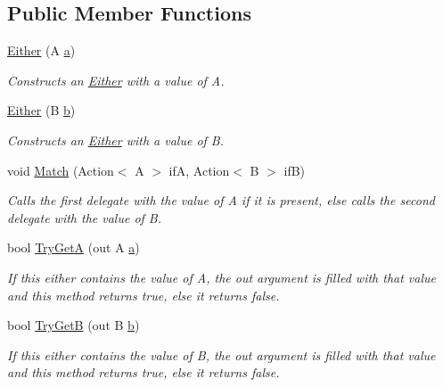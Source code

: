\subsection*{Public Member Functions}
\begin{DoxyCompactItemize}
\item 
\mbox{\hyperlink{struct_leap_1_1_unity_1_1_either_aff7e724eb9b602c97e27bba85b4e3aa1}{Either}} (A \mbox{\hyperlink{struct_leap_1_1_unity_1_1_either_ac7c612037b34bbfb23251111dae09928}{a}})
\begin{DoxyCompactList}\small\item\em Constructs an \mbox{\hyperlink{struct_leap_1_1_unity_1_1_either}{Either}} with a value of A. \end{DoxyCompactList}\item 
\mbox{\hyperlink{struct_leap_1_1_unity_1_1_either_a42d1ab7f4e2bf0794752cc858affec7a}{Either}} (B \mbox{\hyperlink{struct_leap_1_1_unity_1_1_either_aaa579850040ea7c13ab798269e23fd0c}{b}})
\begin{DoxyCompactList}\small\item\em Constructs an \mbox{\hyperlink{struct_leap_1_1_unity_1_1_either}{Either}} with a value of B. \end{DoxyCompactList}\item 
void \mbox{\hyperlink{struct_leap_1_1_unity_1_1_either_a4c0eaf284c03842b99f53ec3f059faac}{Match}} (Action$<$ A $>$ ifA, Action$<$ B $>$ ifB)
\begin{DoxyCompactList}\small\item\em Calls the first delegate with the value of A if it is present, else calls the second delegate with the value of B. \end{DoxyCompactList}\item 
bool \mbox{\hyperlink{struct_leap_1_1_unity_1_1_either_a7ef635be83e9e5e874739d9f363692ef}{Try\+GetA}} (out A \mbox{\hyperlink{struct_leap_1_1_unity_1_1_either_ac7c612037b34bbfb23251111dae09928}{a}})
\begin{DoxyCompactList}\small\item\em If this either contains the value of A, the out argument is filled with that value and this method returns true, else it returns false. \end{DoxyCompactList}\item 
bool \mbox{\hyperlink{struct_leap_1_1_unity_1_1_either_a2936191d85fa4d7dcb85c12ca2f2f471}{Try\+GetB}} (out B \mbox{\hyperlink{struct_leap_1_1_unity_1_1_either_aaa579850040ea7c13ab798269e23fd0c}{b}})
\begin{DoxyCompactList}\small\item\em If this either contains the value of B, the out argument is filled with that value and this method returns true, else it returns false. \end{DoxyCompactList}\item 

\end{DoxyCompactItemize}
